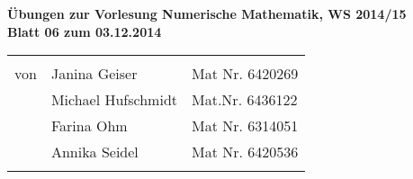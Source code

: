 \documentclass[11pt]{article}
\begin{document}
\begin{center}
\textbf{
Übungen zur Vorlesung Numerische Mathematik, WS 2014/15\\
Blatt 06 zum 03.12.2014\\
}

\begin{tabular}{lll}
& \\
von & Janina Geiser & Mat Nr. 6420269\\
& Michael Hufschmidt & Mat.Nr. 6436122\\
& Farina Ohm & Mat Nr. 6314051\\
& Annika Seidel & Mat Nr. 6420536\\
\\
\hline
\end{tabular}
\end{center}






\end{document}
